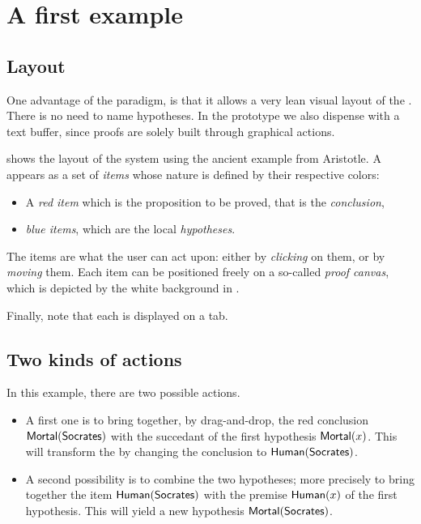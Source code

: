 
\section{A first example}

\subsection{Layout}
One advantage of the  paradigm, is that it allows a very lean visual layout
of the . There is no need to name hypotheses. In the prototype we
also dispense with a text buffer, since proofs are solely built through
graphical actions.


 shows the layout of the system using the
ancient example from Aristotle. A  appears as a set of {\em items}
whose nature is defined by their respective colors:
\begin{itemize}
\item A {\em red item} which is the proposition to be proved, that is the
 {\em conclusion},
\item {\em blue items}, which are the local {\em hypotheses}.
\end{itemize}

The items are what the user can act upon: either by {\em clicking} on them, or
by {\em moving} them. Each item can be positioned freely on a so-called
\emph{proof canvas}, which is depicted by the white background in
.

Finally, note that each  is displayed on a tab.

\subsection{Two kinds of actions}
In this example, there are two possible actions.

\begin{itemize}
\item A first one is to bring together, by drag-and-drop, the red conclusion
$\mbox{\textsf{Mortal}}(\mbox{\textsf{Socrates}})$ with the succedant of the first hypothesis $\mbox{\textsf{Mortal}}(x)$.
This will transform the  by changing the conclusion to $\mbox{\textsf{Human}}(\mbox{\textsf{Socrates}})$.
\item A second possibility is to combine the two hypotheses; more precisely to
bring together the item $\mbox{\textsf{Human}}(\mbox{\textsf{Socrates}})$ with the premise $\mbox{\textsf{Human}}(x)$ of the
first hypothesis. This will yield a new hypothesis $\mbox{\textsf{Mortal}}(\mbox{\textsf{Socrates}})$.
\end{itemize}

